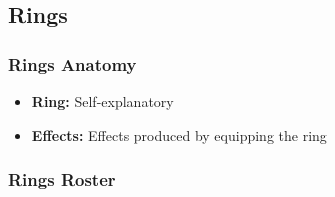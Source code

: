 \documentclass[12pt]{article}
\begin{document}
\pagebreak

\subsection{Rings}
\subsubsection*{Rings Anatomy}
\begin{itemize}
\item \textbf{Ring:} Self-explanatory
\item \textbf{Effects:} Effects produced by equipping the ring
\end{itemize}

\subsubsection*{Rings Roster}
\end{document}
